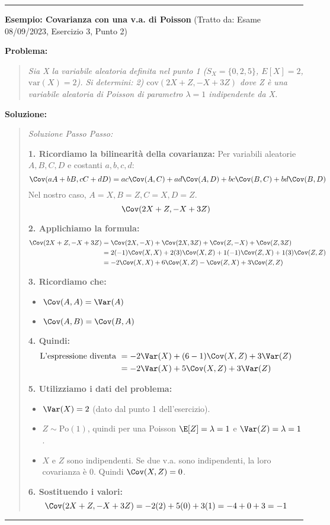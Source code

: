 \vspace{1em}
\hrule
\par\vspace{0.5em}
\noindent\textbf{Esempio: Covarianza con una v.a. di Poisson} (Tratto da: Esame 08/09/2023, Esercizio 3, Punto 2)
\par\vspace{0.5em}
\noindent\textbf{Problema:}
\begin{quote}
\itshape
Sia X la variabile aleatoria definita nel punto 1 ($S_X = \{0,2,5\}$, $E[X] = 2$, $\text{var}(X)=2$).
Si determini:
2) $\text{cov}(2X + Z, -X +3Z)$ dove Z è una variabile aleatoria di Poisson di parametro $\lambda = 1$ indipendente da X.
\end{quote}
\noindent\textbf{Soluzione:}
\begin{quote}
\textit{Soluzione Passo Passo:}

\textbf{1. Ricordiamo la bilinearità della covarianza:}
Per variabili aleatorie $A,B,C,D$ e costanti $a,b,c,d$:
\[ \Cov(aA+bB, cC+dD) = ac \Cov(A,C) + ad \Cov(A,D) + bc \Cov(B,C) + bd \Cov(B,D) \]
Nel nostro caso, $A=X, B=Z, C=X, D=Z$.
\[ \Cov(2X+Z, -X+3Z) \]

\textbf{2. Applichiamo la formula:}
\begin{align*}
    \Cov(2X+Z, -X+3Z) &= \Cov(2X, -X) + \Cov(2X, 3Z) + \Cov(Z, -X) + \Cov(Z, 3Z) \\
    &= 2(-1)\Cov(X,X) + 2(3)\Cov(X,Z) + 1(-1)\Cov(Z,X) + 1(3)\Cov(Z,Z) \\
    &= -2 \Cov(X,X) + 6 \Cov(X,Z) - \Cov(Z,X) + 3 \Cov(Z,Z)
\end{align*}

\textbf{3. Ricordiamo che:}
\begin{itemize}
    \item $\Cov(A,A) = \Var(A)$ 
    \item $\Cov(A,B) = \Cov(B,A)$
\end{itemize}

\textbf{4. Quindi:}
\begin{align*}
    \text{L'espressione diventa } &= -2 \Var(X) + (6-1) \Cov(X,Z) + 3 \Var(Z) \\
    &= -2 \Var(X) + 5 \Cov(X,Z) + 3 \Var(Z)
\end{align*}

\textbf{5. Utilizziamo i dati del problema:}
\begin{itemize}
    \item $\Var(X) = 2$ (dato dal punto 1 dell'esercizio).
    \item $Z \sim \text{Po}(1)$, quindi per una Poisson $\E[Z]=\lambda=1$ e $\Var(Z)=\lambda=1$.
    \item $X$ e $Z$ sono indipendenti. Se due v.a. sono indipendenti, la loro covarianza è 0. Quindi $\Cov(X,Z)=0$.
\end{itemize}

\textbf{6. Sostituendo i valori:}
\[ \Cov(2X+Z, -X+3Z) = -2(2) + 5(0) + 3(1) = -4 + 0 + 3 = -1 \]
\end{quote}
\vspace{0.5em}
\hrule
\vspace{1em}


